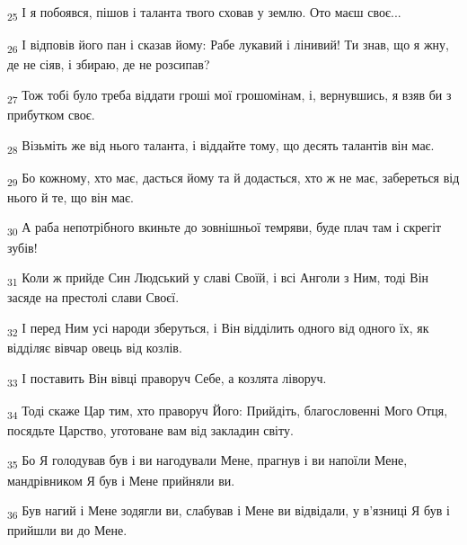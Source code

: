 \begin{tcolorbox}
\textsubscript{25} І я побоявся, пішов і таланта твого сховав у землю. Ото маєш своє...
\end{tcolorbox}
\begin{tcolorbox}
\textsubscript{26} І відповів його пан і сказав йому: Рабе лукавий і лінивий! Ти знав, що я жну, де не сіяв, і збираю, де не розсипав?
\end{tcolorbox}
\begin{tcolorbox}
\textsubscript{27} Тож тобі було треба віддати гроші мої грошомінам, і, вернувшись, я взяв би з прибутком своє.
\end{tcolorbox}
\begin{tcolorbox}
\textsubscript{28} Візьміть же від нього таланта, і віддайте тому, що десять талантів він має.
\end{tcolorbox}
\begin{tcolorbox}
\textsubscript{29} Бо кожному, хто має, дасться йому та й додасться, хто ж не має, забереться від нього й те, що він має.
\end{tcolorbox}
\begin{tcolorbox}
\textsubscript{30} А раба непотрібного вкиньте до зовнішньої темряви, буде плач там і скрегіт зубів!
\end{tcolorbox}
\begin{tcolorbox}
\textsubscript{31} Коли ж прийде Син Людський у славі Своїй, і всі Анголи з Ним, тоді Він засяде на престолі слави Своєї.
\end{tcolorbox}
\begin{tcolorbox}
\textsubscript{32} І перед Ним усі народи зберуться, і Він відділить одного від одного їх, як відділяє вівчар овець від козлів.
\end{tcolorbox}
\begin{tcolorbox}
\textsubscript{33} І поставить Він вівці праворуч Себе, а козлята ліворуч.
\end{tcolorbox}
\begin{tcolorbox}
\textsubscript{34} Тоді скаже Цар тим, хто праворуч Його: Прийдіть, благословенні Мого Отця, посядьте Царство, уготоване вам від закладин світу.
\end{tcolorbox}
\begin{tcolorbox}
\textsubscript{35} Бо Я голодував був і ви нагодували Мене, прагнув і ви напоїли Мене, мандрівником Я був і Мене прийняли ви.
\end{tcolorbox}
\begin{tcolorbox}
\textsubscript{36} Був нагий і Мене зодягли ви, слабував і Мене ви відвідали, у в'язниці Я був і прийшли ви до Мене.
\end{tcolorbox}
